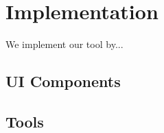 \section{Implementation}
We implement our tool by...

\subsection{UI Components}
\subsection{Tools}
